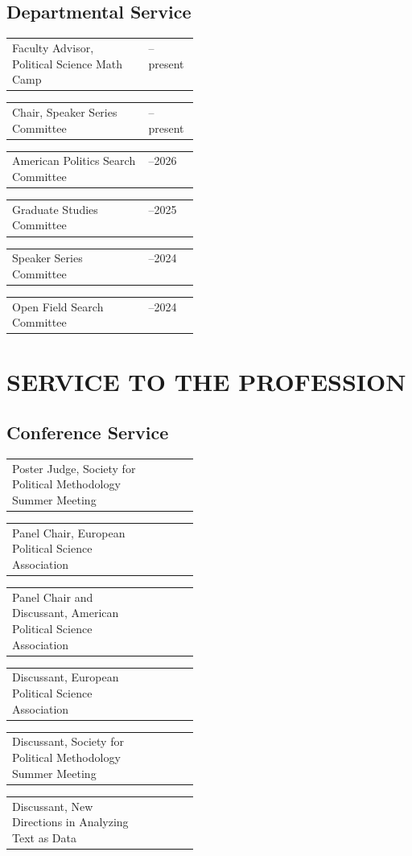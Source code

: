 \documentclass[11pt,a4paper]{article}
\makeatletter
\newcommand{\cvrow}[2]{%
  \noindent\begin{tabularx}{\linewidth}{@{}X>{\raggedleft\arraybackslash}p{0.27\linewidth}@{}}
  #1 & #2
  \end{tabularx}\par
}
\makeatother
\begin{document}
\subsection*{Departmental Service}
\cvrow{Faculty Advisor, Political Science Math Camp}{2024--present}
\cvrow{Chair, Speaker Series Committee}{2024--present}
\cvrow{American Politics Search Committee}{2025--2026}
\cvrow{Graduate Studies Committee}{2024--2025}
\cvrow{Speaker Series Committee}{2023--2024}
\cvrow{Open Field Search Committee}{2023--2024}

\section{SERVICE TO THE PROFESSION}
\subsection*{Conference Service}
\cvrow{Poster Judge, Society for Political Methodology Summer Meeting}{2025}
\cvrow{Panel Chair, European Political Science Association}{2025}
\cvrow{Panel Chair and Discussant, American Political Science Association}{2024}
\cvrow{Discussant, European Political Science Association}{2024}
\cvrow{Discussant, Society for Political Methodology Summer Meeting}{2022}
\cvrow{Discussant, New Directions in Analyzing Text as Data}{2019}

%
%
\end{document}
